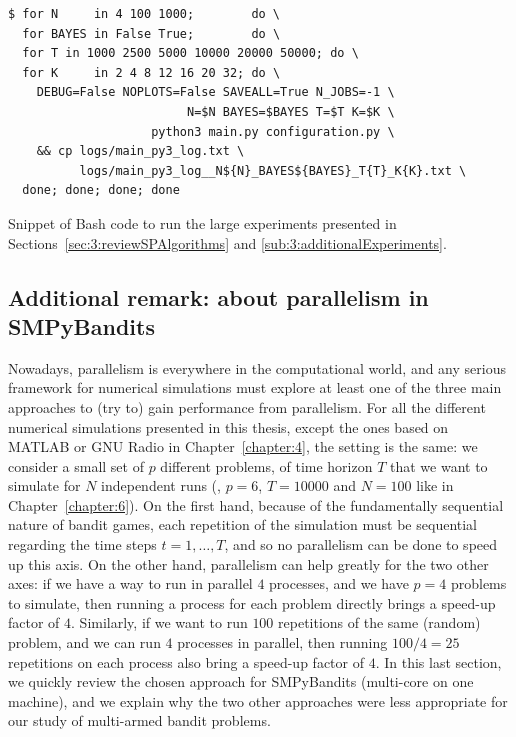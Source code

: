 \begin{listing}[h!]
    \begin{verbatim}
$ for N     in 4 100 1000;        do \
  for BAYES in False True;        do \
  for T in 1000 2500 5000 10000 20000 50000; do \
  for K     in 2 4 8 12 16 20 32; do \
    DEBUG=False NOPLOTS=False SAVEALL=True N_JOBS=-1 \
                         N=$N BAYES=$BAYES T=$T K=$K \
                    python3 main.py configuration.py \
    && cp logs/main_py3_log.txt \
          logs/main_py3_log__N${N}_BAYES${BAYES}_T{T}_K{K}.txt \
  done; done; done; done
    \end{verbatim}
    \caption{Snippet of Bash code to run the large experiments presented in Sections~\ref{sec:3:reviewSPAlgorithms} and \ref{sub:3:additionalExperiments}.}
    \label{lst:3:BashCodeToLaunchLargeExperiments}
\end{listing}


\subsection{Additional remark: about parallelism in SMPyBandits}
\label{sub:3:parallelSimulations}


Nowadays, parallelism is everywhere in the computational world, and any serious framework for numerical simulations must explore at least one of the three main approaches to (try to) gain performance from parallelism.
%
For all the different numerical simulations presented in this thesis, except the ones based on MATLAB or GNU Radio in Chapter~\ref{chapter:4}, the setting is the same: we consider a small set of $p$ different problems, of time horizon $T$ that we want to simulate for $N$ independent runs (\eg, $p=6$, $T=10000$ and $N=100$ like in Chapter~\ref{chapter:6}).
On the first hand, because of the fundamentally sequential nature of bandit games, each repetition of the simulation must be sequential regarding the time steps $t=1,\dots,T$, and so no parallelism can be done to speed up this axis.
On the other hand, parallelism can help greatly for the two other axes: if we have a way to run in parallel $4$ processes, and we have $p=4$ problems to simulate, then running a process for each problem directly brings a speed-up factor of $4$.
Similarly, if we want to run $100$ repetitions of the same (random) problem, and we can run $4$ processes in parallel, then running $100/4=25$ repetitions on each process also bring a speed-up factor of $4$.
%
In this last section, we quickly review the chosen approach for SMPyBandits (multi-core on one machine), and we explain why the two other approaches were less appropriate for our study of multi-armed bandit problems.

